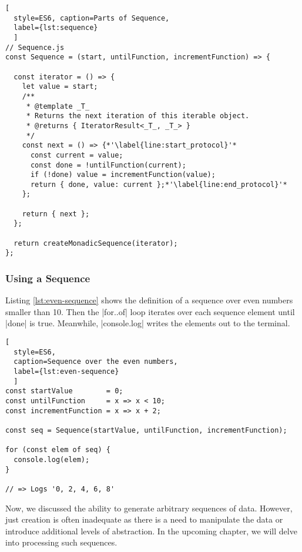 \begin{lstlisting}[
  style=ES6, caption=Parts of Sequence,
  label={lst:sequence}
  ]
// Sequence.js
const Sequence = (start, untilFunction, incrementFunction) => {

  const iterator = () => {
    let value = start;
    /**
     * @template _T_
     * Returns the next iteration of this iterable object.
     * @returns { IteratorResult<_T_, _T_> }
     */
    const next = () => {*'\label{line:start_protocol}'*
      const current = value;
      const done = !untilFunction(current);
      if (!done) value = incrementFunction(value);
      return { done, value: current };*'\label{line:end_protocol}'*
    };

    return { next };
  };

  return createMonadicSequence(iterator);
};
\end{lstlisting}


\subsubsection{Using a Sequence}
\label{subsub:Using a Sequence}
Listing \ref{lst:even-sequence} shows the definition of a sequence over even 
numbers smaller than 10. Then the |for..of| loop iterates over each sequence 
element until |done| is true. Meanwhile, |console.log| writes the elements out 
to the terminal.

\begin{lstlisting}[
  style=ES6, 
  caption=Sequence over the even numbers,
  label={lst:even-sequence}
  ]
const startValue        = 0;
const untilFunction     = x => x < 10;
const incrementFunction = x => x + 2;

const seq = Sequence(startValue, untilFunction, incrementFunction);

for (const elem of seq) {
  console.log(elem);
}

// => Logs '0, 2, 4, 6, 8'
\end{lstlisting}

Now, we discussed the ability to generate arbitrary sequences of data. However, 
just creation is often inadequate as there is a need to manipulate the data or 
introduce additional levels of abstraction. In the upcoming chapter, we will 
delve into processing such sequences.

